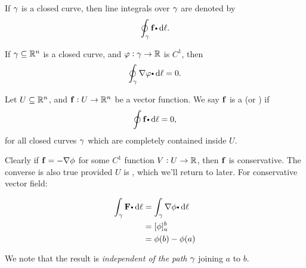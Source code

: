   If $\gamma$ is a closed curve, then line integrals over $\gamma$ are denoted by
  \begin{equation*}
    \doint_\caminho \funvect{f} \bp \dif \ell.
  \end{equation*}

  \begin{corollary}\label{clyLintGrad}
    If $\gamma \subseteq \mathbb{R}^n$ is a closed curve, and $\varphi:\gamma \to \mathbb{R}$ is $C^1$,  then
    \begin{equation*}
      \doint_\caminho \grad \varphi \bp \dif \ell = 0.
    \end{equation*}
  \end{corollary}

  \begin{definition}
    Let $U \subseteq \mathbb{R}^n$, and $\mathbf{ f}:U \to \mathbb{R}^n$ be a vector function.
    We say $\mathbf{ f}$ is a  (or ) if
    \begin{equation*}
      \doint \funvect{f} \bp \dif \ell = 0,
    \end{equation*}
    for all closed curves $\gamma$ which are completely contained inside $U$.
  \end{definition}

  Clearly if $\mathbf{ f} = - \nabla \phi$ for some $C^1$ function $V:U \to \mathbb{R}$, then $\mathbf{ f}$ is conservative.
  The converse is also true provided $U$ is , which we'll return to later.
For conservative vector field:
  
\begin{align*}
  \dint_\gamma \vector F  \bp \dif \ell 
  &= \dint_\gamma \nabla \phi  \bp \dif \ell \\
  &= [\phi]_a^b\\
  &= \phi(b) - \phi(a)
\end{align*}  
  
We note that the result is \emph{independent of the path} $\gamma$ joining $a$ to $b$. 
\begin{center}
	
\end{center}

